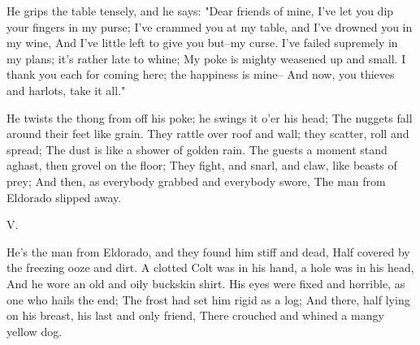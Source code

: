 \begin{poemblock}
 He grips the table tensely, and he says:  "Dear friends of mine,
  I've let you dip your fingers in my purse;
 I've crammed you at my table, and I've drowned you in my wine,
  And I've little left to give you but--my curse.
 I've failed supremely in my plans; it's rather late to whine;
  My poke is mighty weasened up and small.
 I thank you each for coming here; the happiness is mine--
  And now, you thieves and harlots, take it all."

 He twists the thong from off his poke; he swings it o'er his head;
  The nuggets fall around their feet like grain.
 They rattle over roof and wall; they scatter, roll and spread;
  The dust is like a shower of golden rain.
 The guests a moment stand aghast, then grovel on the floor;
  They fight, and snarl, and claw, like beasts of prey;
 And then, as everybody grabbed and everybody swore,
  The man from Eldorado slipped away.


 V.

 He's the man from Eldorado, and they found him stiff and dead,
  Half covered by the freezing ooze and dirt.
 A clotted Colt was in his hand, a hole was in his head,
  And he wore an old and oily buckskin shirt.
 His eyes were fixed and horrible, as one who hails the end;
  The frost had set him rigid as a log;
 And there, half lying on his breast, his last and only friend,
  There crouched and whined a mangy yellow dog.
\end{poemblock}
